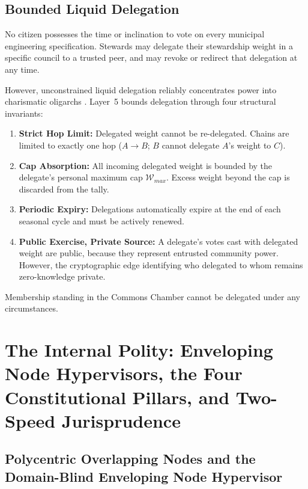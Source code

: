 \subsection{Bounded Liquid Delegation}

No citizen possesses the time or inclination to vote on every municipal engineering specification. Stewards may delegate their stewardship weight in a specific council to a trusted peer, and may revoke or redirect that delegation at any time.

However, unconstrained liquid delegation reliably concentrates power into charismatic oligarchs \parencite{michels1911}. Layer~5 bounds delegation through four structural invariants:
\begin{enumerate}
  \item \textbf{Strict Hop Limit:} Delegated weight cannot be re-delegated. Chains are limited to exactly one hop ($A \to B$; $B$ cannot delegate $A$'s weight to $C$).
  \item \textbf{Cap Absorption:} All incoming delegated weight is bounded by the delegate's personal maximum cap $\mathcal{W}_{max}$. Excess weight beyond the cap is discarded from the tally.
  \item \textbf{Periodic Expiry:} Delegations automatically expire at the end of each seasonal cycle and must be actively renewed.
  \item \textbf{Public Exercise, Private Source:} A delegate's votes cast with delegated weight are public, because they represent entrusted community power. However, the cryptographic edge identifying who delegated to whom remains zero-knowledge private.
\end{enumerate}
Membership standing in the Commons Chamber cannot be delegated under any circumstances.

\section{The Internal Polity: Enveloping Node Hypervisors, the Four Constitutional Pillars, and Two-Speed Jurisprudence}
\label{sec:l5-polity}

\subsection{Polycentric Overlapping Nodes and the Domain-Blind Enveloping Node Hypervisor}
\label{subsec:l5-enveloping-hypervisor}

